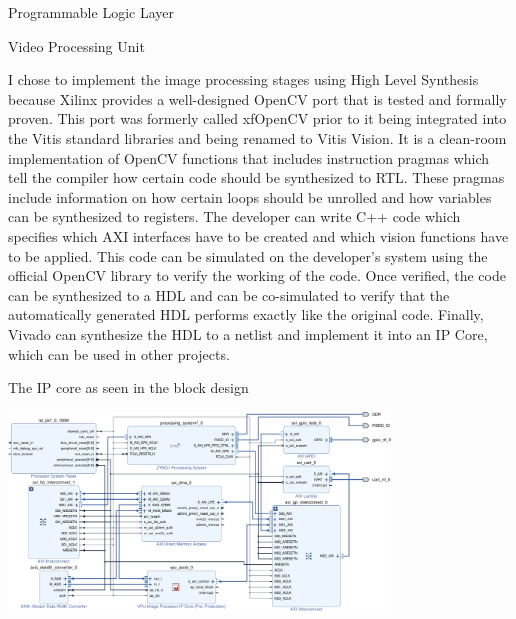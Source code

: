 \documentclass{matthijs}
\begin{document}
	\begin{hoofdstuk}{Programmable Logic Layer}

		\begin{paragraaf}{Video Processing Unit}

			I chose to implement the image processing stages using High Level Synthesis because Xilinx provides a well-designed OpenCV port that is tested and formally proven.
			This port was formerly called xfOpenCV prior to it being integrated into the Vitis standard libraries and being renamed to Vitis Vision.
			It is a clean-room implementation of OpenCV functions that includes instruction pragmas which tell the compiler how certain code should be synthesized to RTL.
			These pragmas include information on how certain loops should be unrolled and how variables can be synthesized to registers.
			The developer can write C++ code which specifies which AXI interfaces have to be created and which vision functions have to be applied.
			This code can be simulated on the developer's system using the official OpenCV library to verify the working of the code.
			Once verified, the code can be synthesized to a HDL and can be co-simulated to verify that the automatically generated HDL performs exactly like the original code.
			Finally, Vivado can synthesize the HDL to a netlist and implement it into an IP Core, which can be used in other projects.

			\vspace{1ex}
			\begin{figuur}{The IP core as seen in the block design}
				\centerline{
					\includegraphics[width=0.76\textwidth, clip, trim=8.75cm 0.16cm 11.5cm 12.2cm]{hw-block-diagram-v2-crop-asset.pdf}
				}

				\vspace{3ex}


\end{figuur}
\end{paragraaf}
\end{hoofdstuk}
\end{document}
